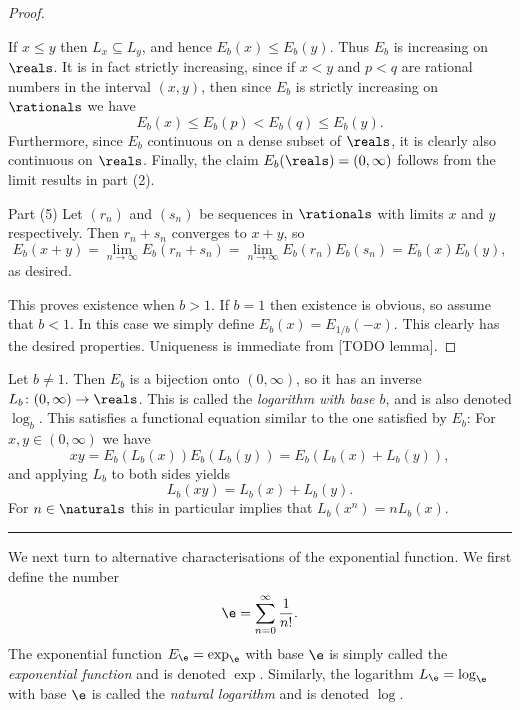 \documentclass[article, a4paper, 11pt, oneside]{memoir}
\numberwithin{equation}{chapter}
\newcommand\fleuronbreak{\fancybreak{\textcolor{linkcolor}{\adfhangingflatleafleft}}}
\begin{document}
\begin{proof}
\begin{proofsec}
        If $x \leq y$ then $L_x \subseteq L_y$, and hence $E_b(x) \leq E_b(y)$. Thus $E_b$ is increasing on $\reals$. It is in fact strictly increasing, since if $x < y$ and $p < q$ are rational numbers in the interval $(x,y)$, then since $E_b$ is strictly increasing on $\rationals$ we have
        \begin{equation*}
            E_b(x)
                \leq E_b(p)
                < E_b(q)
                \leq E_b(y).
        \end{equation*}
        Furthermore, since $E_b$ continuous on a dense subset of $\reals$, it is clearly also continuous on $\reals$. Finally, the claim $E_b(\reals) = (0,\infty)$ follows from the limit results in part (2).

        \item[Part (5)]
        Let $(r_n)$ and $(s_n)$ be sequences in $\rationals$ with limits $x$ and $y$ respectively. Then $r_n+s_n$ converges to $x+y$, so
        \begin{equation*}
            E_b(x+y)
                = \lim_{n\to\infty} E_b(r_n + s_n)
                = \lim_{n\to\infty} E_b(r_n) E_b(s_n)
                = E_b(x) E_b(y),
        \end{equation*}
        as desired.
    \end{proofsec}

    This proves existence when $b > 1$. If $b = 1$ then existence is obvious, so assume that $b < 1$. In this case we simply define $E_b(x) = E_{1/b}(-x)$. This clearly has the desired properties. Uniqueness is immediate from [TODO lemma].
\end{proof}
%
Let $b \neq 1$. Then $E_b$ is a bijection onto $(0,\infty)$, so it has an inverse $L_b \colon (0,\infty) \to \reals$. This is called the \emph{logarithm with base $b$}, and is also denoted $\log_b$. This satisfies a functional equation similar to the one satisfied by $E_b$: For $x,y \in (0,\infty)$ we have
%
\begin{equation*}
    xy
        = E_b(L_b(x)) E_b(L_b(y))
        = E_b(L_b(x) + L_b(y)),
\end{equation*}
%
and applying $L_b$ to both sides yields
%
\begin{equation*}
    L_b(xy) = L_b(x) + L_b(y).
\end{equation*}
%
For $n \in \naturals$ this in particular implies that $L_b(x^n) = n L_b(x)$.

\fleuronbreak

We next turn to alternative characterisations of the exponential function. We first define the number
%
\begin{equation*}
    \e = \sum_{n=0}^\infty \frac{1}{n!}.
\end{equation*}
%
The exponential function $E_{\e} = \exp_{\e}$ with base $\e$ is simply called the \emph{exponential function} and is denoted $\exp$. Similarly, the logarithm $L_{\e} = \log_{\e}$ with base $\e$ is called the \emph{natural logarithm} and is denoted $\log$.
\end{document}
